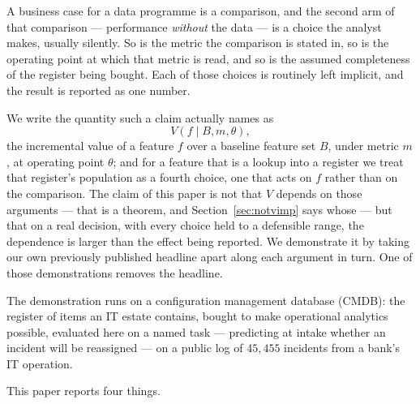\documentclass[preprint,12pt]{elsarticle}
\begin{document}
A business case for a data programme is a comparison, and the second arm of
that comparison --- performance \emph{without} the data --- is a choice the
analyst makes, usually silently. So is the metric the comparison is stated
in, so is the operating point at which that metric is read, and so is the
assumed completeness of the register being bought. Each of those choices is
routinely left implicit, and the result is reported as one number.

We write the quantity such a claim actually names as
\begin{equation}
V(f \mid B, m, \theta),
\label{eq:estimand}
\end{equation}
the incremental value of a feature $f$ over a baseline feature set $B$, under
metric $m$, at operating point $\theta$; and for a feature that is a lookup
into a register we treat that register's population as a fourth choice, one
that acts on $f$ rather than on the comparison. The claim of this paper is not
that $V$ depends on those arguments --- that is a theorem, and
Section~\ref{sec:notvimp} says whose --- but that on a real decision, with
every choice held to a defensible range, the dependence is larger than the
effect being reported. We demonstrate it by taking our own previously
published headline apart along each argument in turn. One of those
demonstrations removes the headline.

The demonstration runs on a configuration management database (CMDB): the
register of items an IT estate contains, bought to make operational analytics
possible, evaluated here on a named task --- predicting at intake whether an
incident will be reassigned --- on a public log of $45{,}455$ incidents from a
bank's IT operation.

This paper reports four things.
\end{document}
